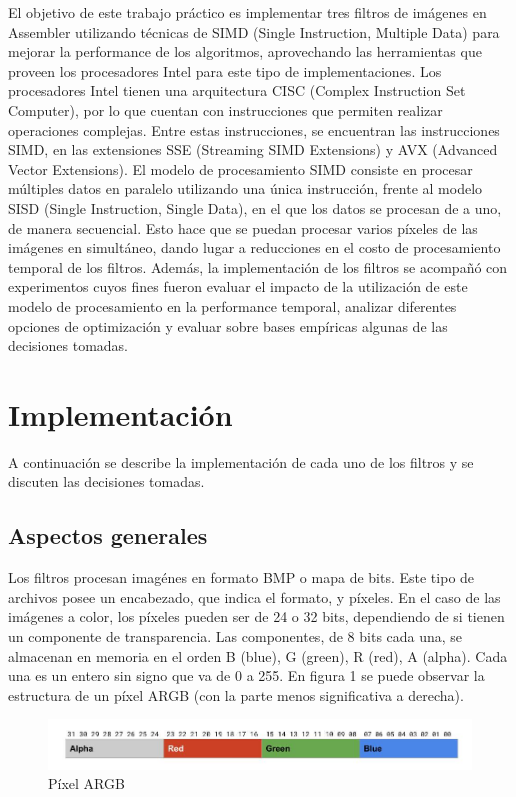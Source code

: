 \documentclass[a4paper]{article}
\begin{document}
El objetivo de este trabajo práctico es implementar tres filtros de imágenes en Assembler utilizando técnicas de SIMD (Single Instruction, Multiple Data) para mejorar la performance de los algoritmos, aprovechando las herramientas que proveen los procesadores Intel para este tipo de implementaciones.
Los procesadores Intel tienen una arquitectura CISC (Complex Instruction Set Computer), por lo que cuentan con instrucciones que permiten realizar operaciones complejas. Entre estas instrucciones, se encuentran las instrucciones SIMD, en las extensiones SSE (Streaming SIMD Extensions) y AVX (Advanced Vector Extensions).
El modelo de procesamiento SIMD consiste en procesar múltiples datos en paralelo utilizando una única instrucción, frente al modelo SISD (Single Instruction, Single Data), en el que los datos se procesan de a uno, de manera secuencial. Esto hace que se puedan procesar varios píxeles de las imágenes en simultáneo, dando lugar a reducciones en el costo de procesamiento temporal de los filtros.
Además, la implementación de los filtros se acompañó con experimentos cuyos fines fueron evaluar el impacto de la utilización de este modelo de procesamiento en la performance temporal, analizar diferentes opciones de optimización y evaluar sobre bases empíricas algunas de las decisiones tomadas.

\section{Implementación}
A continuación se describe la implementación de cada uno de los filtros y se discuten las decisiones tomadas.

\subsection{Aspectos generales}
Los filtros procesan imagénes en formato BMP o mapa de bits. Este tipo de archivos posee un encabezado, que indica el formato, y píxeles. En el caso de las imágenes a color, los píxeles pueden ser de 24 o 32 bits, dependiendo de si tienen un componente de transparencia. Las componentes, de 8 bits cada una, se almacenan en memoria en el orden B (blue), G (green), R (red), A (alpha). Cada una es un entero sin signo que va de 0 a 255. En figura 1 se puede observar la estructura de un píxel ARGB (con la parte menos significativa a derecha).

\begin{figure}[!htb]
  \begin{center}
	\includegraphics[scale=0.4]{img/RGB.jpg}
	\caption{Píxel ARGB}
  \end{center}
\end{figure}
\end{document}
